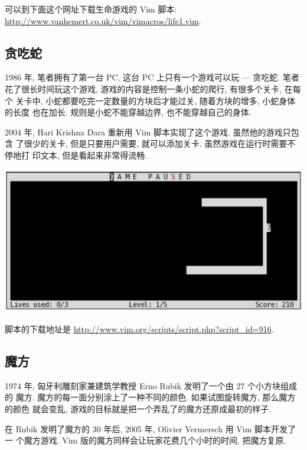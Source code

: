可以到下面这个网址下载生命游戏的 Vim 脚本:
\url{http://www.vanhemert.co.uk/vim/vimacros/life1.vim}.

\subsection{贪吃蛇}
\label{subsec:nibbles}

1986 年, 笔者拥有了第一台 PC, 这台 PC 上只有一个游戏可以玩 --- 贪吃蛇. 笔者
花了很长时间玩这个游戏, 游戏的内容是控制一条小蛇的爬行, 有很多个关卡, 在每个
关卡中, 小蛇都要吃完一定数量的方块后才能过关, 随着方块的增多, 小蛇身体的长度
也在加长. 规则是小蛇不能穿越边界, 也不能穿越自己的身体.

2004 年, Hari Krishna Dara 重新用 Vim 脚本实现了这个游戏. 虽然他的游戏只包含
了很少的关卡, 但是只要用户需要, 就可以添加关卡. 虽然游戏在运行时需要不停地打
印文本, 但是看起来非常得流畅.

\begin{center}
    \includegraphics[scale=0.6]{./images/page203-1.png}
\end{center}

脚本的下载地址是 \url{http://www.vim.org/scripts/script.php?script_id=916}.

\subsection{魔方}
\label{subsec:rubik_s_cube}

1974 年, 匈牙利雕刻家兼建筑学教授 Erno Rubik 发明了一个由 27 个小方块组成的
魔方. 魔方的每一面分别涂上了一种不同的颜色. 如果试图旋转魔方, 那么魔方的颜色
就会变乱, 游戏的目标就是把一个弄乱了的魔方还原成最初的样子.

在 Rubik 发明了魔方的 30 年后, 2005 年, Olivier Vermersch 用 Vim 脚本开发了一
个魔方游戏. Vim 版的魔方同样会让玩家花费几个小时的时间, 把魔方复原.


